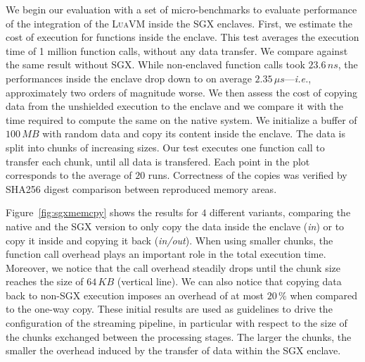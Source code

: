 We begin our evaluation with a set of micro-benchmarks to evaluate performance of the integration of the \textsc{LuaVM} inside the SGX enclaves.
First, we estimate the cost of execution for functions inside the enclave.
This test averages the execution time of 1 million function calls, without any data transfer.
We compare against the same result without SGX.
While non-enclaved function calls took $23.6\,ns$, the performances inside the enclave drop down to on average $2.35\,\mu{}s$---\textit{i.e.}, approximately two orders of magnitude worse.
We then assess the cost of copying data from the unshielded execution to the enclave and we compare it with the time required to compute the same on the native system.
We initialize a buffer of $100\,MB$ with random data and copy its content inside the enclave.
The data is split into chunks of increasing sizes.
Our test executes one function call to transfer each chunk, until all data is transfered.
Each point in the plot corresponds to the average of $20$ runs.
Correctness of the copies was verified by \textsf{SHA256} digest comparison between reproduced memory areas.

Figure~\ref{fig:sgxmemcpy} shows the results for $4$ different variants, comparing the native and the SGX version to only copy the data inside the enclave (\emph{in}) or to copy it inside and copying it back (\emph{in/out}).
When using smaller chunks, the function call overhead plays an important role in the total execution time.
Moreover, we notice that the call overhead steadily drops until the chunk size reaches the size of $64\,KB$ (vertical line).
We can also notice that copying data back to non-SGX execution imposes an overhead of at most $20\,\%$ when compared to the one-way copy.
These initial results are used as guidelines to drive the configuration of the streaming pipeline, in particular with respect to the size of the chunks exchanged between the processing stages. %
The larger the chunks, the smaller the overhead induced by the transfer of data within the SGX enclave.

